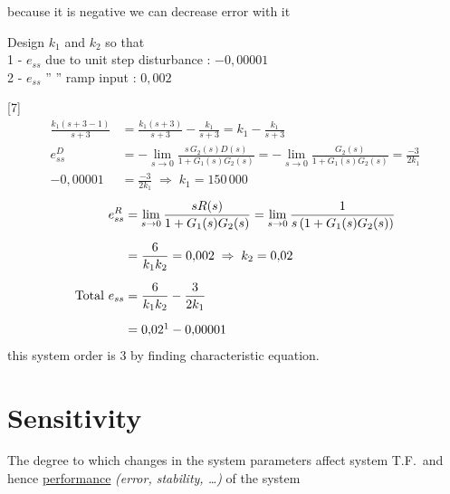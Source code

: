 \documentclass[11pt,a4paper]{article}
\begin{document}
because it is negative we can decrease error with it

\begin{ornek}
Design $k_1$ and $k_2$ so that\\
1 - $e_{ss}$ due to unit step disturbance : $-0{,}00001$\\
2 - $e_{ss}$ '' '' ramp input : $0{,}002$
\end{ornek}
[7]
\begin{align*}
\frac{k_1(s+3-1)}{s+3}&=\frac{k_1(s+3)}{s+3}-\frac{k_1}{s+3}=k_1-\frac{k_1}{s+3}\\[6pt]
e_{ss}^{D}&=-\lim_{s\to0}\frac{s\,G_2(s)D(s)}{1+G_1(s)G_2(s)}=-\lim_{s\to0}\frac{G_2(s)}{1+G_1(s)G_2(s)}=\frac{-3}{2k_1}\\[6pt]
-0{,}00001&=\frac{-3}{2k_1}\;\Rightarrow\;k_1=150\,000
\end{align*}
\begin{align*}
e_{ss}^{R}&=\lim_{s\to0}\frac{sR(s)}{1+G_1(s)G_2(s)}=\lim_{s\to0}\frac{1}{s\left(1+G_1(s)G_2(s)\right)}\\[6pt]
&=\frac{6}{k_1k_2}=0{,}002\;\Rightarrow\;k_2=0{,}02\\[6pt]
\text{Total }e_{ss}&=\frac{6}{k_1k_2}-\frac{3}{2k_1}\\[6pt]
&=0{,}02\footnotemark-0{,}00001
\end{align*}
this system order is 3 \quad by finding characteristic equation.

\section{Sensitivity}
The degree to which changes in the system parameters affect system T.F.\ and hence \underline{performance} \textit{(error, stability, \ldots)} of the system
\end{document}
